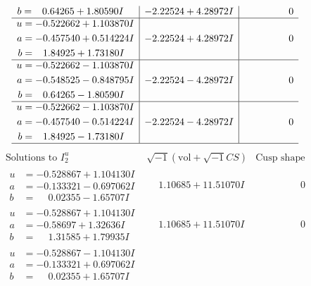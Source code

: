 \documentclass[1p]{elsarticle_modified}
\theoremstyle{definition}
\newcommand{\I}{\sqrt{-1}}
\begin{document}
$$\begin{array}{c|c|c}
\begin{aligned}
b &= \phantom{-}0.64265 + 1.80590 I\end{aligned}
 & -2.22524 + 4.28972 I & \phantom{-0.000000 } 0 \\ \hline\begin{aligned}
u &= -0.522662 + 1.103870 I \\
a &= -0.457540 + 0.514224 I \\
b &= \phantom{-}1.84925 + 1.73180 I\end{aligned}
 & -2.22524 + 4.28972 I & \phantom{-0.000000 } 0 \\ \hline\begin{aligned}
u &= -0.522662 - 1.103870 I \\
a &= -0.548525 - 0.848795 I \\
b &= \phantom{-}0.64265 - 1.80590 I\end{aligned}
 & -2.22524 - 4.28972 I & \phantom{-0.000000 } 0 \\ \hline\begin{aligned}
u &= -0.522662 - 1.103870 I \\
a &= -0.457540 - 0.514224 I \\
b &= \phantom{-}1.84925 - 1.73180 I\end{aligned}
 & -2.22524 - 4.28972 I & \phantom{-0.000000 } 0\\
 \hline 
 \end{array}$$\newpage$$\begin{array}{c|c|c}  
\text{Solutions to }I^u_{2}& \I (\text{vol} + \sqrt{-1}CS) & \text{Cusp shape}\\
 \hline 
\begin{aligned}
u &= -0.528867 + 1.104130 I \\
a &= -0.133321 - 0.697062 I \\
b &= \phantom{-}0.02355 - 1.65707 I\end{aligned}
 & \phantom{-}1.10685 + 11.51070 I & \phantom{-0.000000 } 0 \\ \hline\begin{aligned}
u &= -0.528867 + 1.104130 I \\
a &= -0.58697 + 1.32636 I \\
b &= \phantom{-}1.31585 + 1.79935 I\end{aligned}
 & \phantom{-}1.10685 + 11.51070 I & \phantom{-0.000000 } 0 \\ \hline\begin{aligned}
u &= -0.528867 - 1.104130 I \\
a &= -0.133321 + 0.697062 I \\
b &= \phantom{-}0.02355 + 1.65707 I\end{aligned}

\end{array}$$
\end{document}
